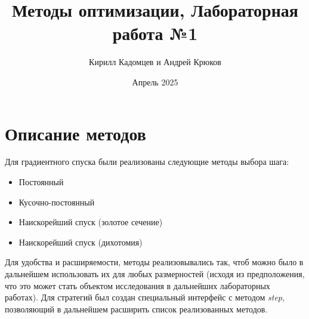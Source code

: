 \documentclass{article}
\title{Методы оптимизации, Лабораторная работа №1}
\author{Кирилл Кадомцев и Андрей Крюков}
\date{Апрель 2025}
\begin{document}
\maketitle
\tableofcontents

\section{Описание методов}
Для градиентного спуска были реализованы следующие методы выбора шага:
\begin{itemize}
    \item 
    Постоянный
    \item
    Кусочно-постоянный
    \item
    Наискорейший спуск (золотое сечение)
    \item
    Наискорейший спуск (дихотомия)
\end{itemize}
Для удобства и расширяемости, методы реализовывались так, чтоб можно было в дальнейшем использовать их для любых размерностей (исходя из предположения, что это может стать объектом исследования в дальнейших лабораторных работах). Для стратегий был создан специальный интерфейс с методом \textit{step}, позволяющий в дальнейшем расширить список реализованных методов.
\end{document}
